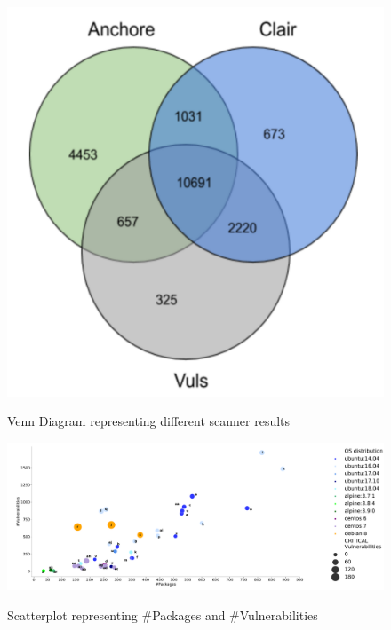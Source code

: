 \documentclass[a4paper,num-refs]{oup-contemporary}
\begin{document}

\begin{figure}[H]
        {\includegraphics[scale=2.5,width=\columnwidth]
        {Figures/vennDiagram.pdf}}
        \caption{\label{fig:venn} Venn Diagram representing different scanner results}
\end{figure}

\begin{figure}[!htb]
	{\includegraphics[scale=1.5,width=\textwidth]
	{Figures/vulngraph.pdf}}
        \caption{\label{fig:graph1} Scatterplot representing \#Packages and \#Vulnerabilities}
      \end{figure}
\end{document}
